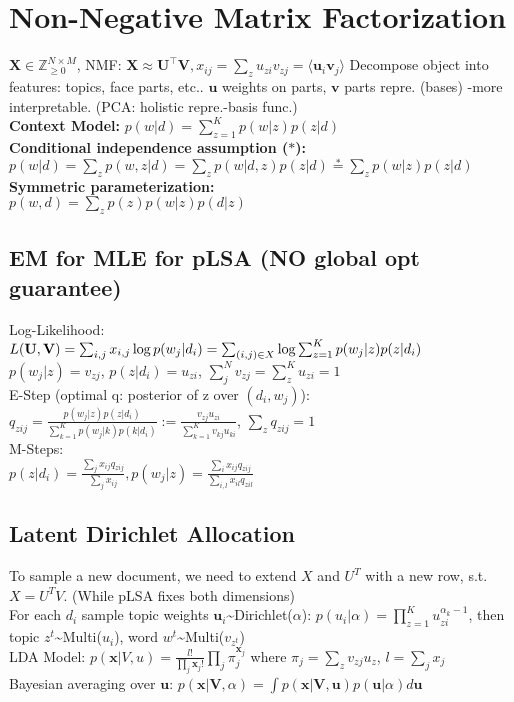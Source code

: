 \section{Non-Negative Matrix Factorization}
$\mathbf{X} \in \mathbb{Z}^{N \times M}_{\geq 0}$, NMF: $\mathbf{X} \approx \mathbf{U^\top V}, x_{ij}=\sum_z{u_{zi}v_{zj}}=\langle\mathbf{u}_i \mathbf{v}_j\rangle$
Decompose object into features: topics, face parts, etc.. $\mathbf{u}$ weights on parts, $\mathbf{v}$ parts repre. (bases) -more interpretable. (PCA: holistic repre.-basis func.)\\
\textbf{Context Model:} $p(w | d) = \sum_{z=1}^K p(w | z) p(z | d)$\\
\textbf{Conditional independence assumption ($*$):}\\
$p(w|d) = \sum_z p(w,z|d) = \sum_z p(w|d,z)p(z|d) \stackrel{*}{=} \sum_z p(w|z)p(z|d)$\\
\textbf{Symmetric parameterization:}\\
$p(w, d) = \sum_z p(z)p(w | z) p(d | z)$ \\
\subsection*{EM for MLE for pLSA (NO global opt guarantee)}
Log-Likelihood: $L(\mathbf{U}, \mathbf{V}) = \sum_{i,j} x_{i,j}\log p(w_j|d_i) \\
= \sum_{(i,j) \in X} \log \sum_{z=1}^K p(w_j|z)p(z|d_i)$ \\ 
$ p(w_j|z) = v_{zj}$, $p(z|d_i) = u_{zi}$, $\sum_j^N v_{zj} = \sum_z^K u_{zi} = 1$\\
E-Step (optimal q: posterior of z over $(d_i, w_j)$):\\
$q_{zij} = \frac{p(w_j|z)p(z|d_i)}{\sum_{k=1}^K p(w_j|k)p(k|d_i)} := \frac{v_{zj}u_{zi}}{\sum_{k=1}^K v_{kj}u_{ki}}$, $\sum_z q_{zij}=1$\\
M-Steps:\\
$p(z|d_i) = \frac{\sum_j x_{ij}q_{zij}}{\sum_j x_{ij}}, p(w_j|z) = \frac{\sum_i x_{ij}q_{zij}}{\sum_{i,l}x_{il}q_{zil}}$\\

\subsection*{Latent Dirichlet Allocation}
To sample a new document, we need to extend $X$ and $U^T$ with a new row, s.t. $X=U^T V$. (While pLSA fixes both dimensions)\\
For each $d_i$ sample topic weights $\mathbf{u}_i$\textasciitilde Dirichlet($\alpha$): $p(u_i|\alpha) = \prod_{z=1}^K u_{zi}^{\alpha_k-1}$, then topic $z^t$\textasciitilde Multi($u_i$), word $w^t$\textasciitilde Multi($v_{z^t}$)\\
LDA Model: $p(\mathbf{x}|V,u) = \frac{l!}{\prod_j \mathbf{x}_j!}\prod_j \pi_j^{\mathbf{x}_j}$ 
where $\pi_j=\sum_z v_{zj} u_z$, $l=\sum_j x_j$ \\
Bayesian averaging over $\mathbf{u}$: $p(\mathbf{x}|\mathbf{V},\alpha)=\int p(\mathbf{x}|\mathbf{V},\mathbf{u})p(\mathbf{u}|\alpha)d\mathbf{u}$

